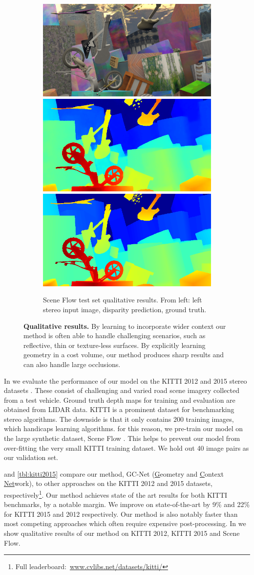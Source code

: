 \begin{figure}[p]
\begin{center}
\begin{subfigure}[t]{\linewidth}
            \vspace{1 mm}
			\includegraphics[width=0.31\linewidth]{results_scene_flow_test/2758_input.png}
			\includegraphics[width=0.31\linewidth]{results_scene_flow_test/2758_disp.png}
			\includegraphics[width=0.31\linewidth]{results_scene_flow_test/2758_gt.png}
	        \caption{Scene Flow test set qualitative results. From left: left stereo input image, disparity prediction, ground truth.}
		\end{subfigure}
	\end{center}
	\caption[Qualitative results.]{\textbf{Qualitative results.} By learning to incorporate wider context our method is often able to handle challenging scenarios, such as reflective, thin or texture-less surfaces. By explicitly learning geometry in a cost volume, our method produces sharp results and can also handle large occlusions.}
	\label{fig:results_qualitative}
\end{figure}

In  we evaluate the performance of our model on the KITTI 2012 and 2015 stereo datasets \citep{Geiger2012CVPR,Menze2015CVPR}. These consist of challenging and varied road scene imagery collected from a test vehicle. Ground truth depth maps for training and evaluation are obtained from LIDAR data. KITTI is a prominent dataset for benchmarking stereo algorithms. The downside is that it only contains $200$ training images, which handicaps learning algorithms. for this reason, we pre-train our model on the large synthetic dataset, Scene Flow \citep{MIFDB16}. This helps to prevent our model from over-fitting the very small KITTI training dataset. We hold out 40 image pairs as our validation set.

 and \ref{tbl:kitti2015} compare our method, GC-Net (\underline{G}eometry and \underline{C}ontext \underline{Net}work), to other approaches on the KITTI 2012 and 2015 datasets, respectively\footnote{Full leaderboard:~\url{www.cvlibs.net/datasets/kitti/}}. Our method achieves state of the art results for both KITTI benchmarks, by a notable margin. We improve on state-of-the-art by 9\% and 22\% for KITTI 2015 and 2012 respectively. Our method is also notably faster than most competing approaches which often require expensive post-processing. In  we show qualitative results of our method on KITTI 2012, KITTI 2015 and Scene Flow.

